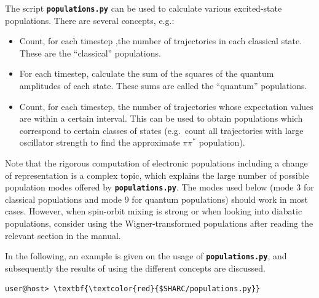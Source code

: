 \documentclass[a4paper,11pt,DIV=15,openany]{scrbook}
\newcommand{\ttt}[1]{\textbf{\texttt{#1}}}
\begin{document}
The script \ttt{populations.py} can be used to calculate various excited-state populations. There are several concepts, e.g.:
\begin{itemize}
  \item Count, for each timestep ,the number of trajectories in each classical state. These are the ``classical'' populations. 
  \item For each timestep, calculate the sum of the squares of the quantum amplitudes of each state. These sums are called the ``quantum'' populations.
  \item Count, for each timestep, the number of trajectories whose expectation values are within a certain interval. This can be used to obtain populations which correspond to certain classes of states (e.g.\ count all trajectories with large oscillator strength to find the approximate $\pi\pi^*$ population).
\end{itemize}

Note that the rigorous computation of electronic populations including a change of representation is a complex topic, which explains the large number of possible population modes offered by \ttt{populations.py}.
The modes used below (mode 3 for classical populations and mode 9 for quantum populations) should work in most cases.
However, when spin-orbit mixing is strong or when looking into diabatic populations, consider using the Wigner-transformed populations after reading the relevant section in the manual.

In the following, an example is given on the usage of \ttt{populations.py}, and subsequently the results of using the different concepts are discussed.
\begin{Verbatim}[commandchars=\\\{\}]
user@host> \textbf{\textcolor{red}{$SHARC/populations.py}}
\end{Verbatim}
\end{document}
